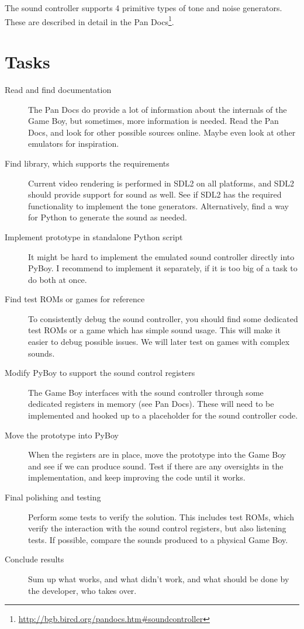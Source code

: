 \documentclass[11pt]{report} %
\begin{document}
The sound controller supports 4 primitive types of tone and noise generators. These are described in detail in the Pan Docs\footnote{\url{http://bgb.bircd.org/pandocs.htm#soundcontroller}}.

\section*{Tasks}
\begin{description}
    \item [Read and find documentation]
        The Pan Docs do provide a lot of information about the internals of the Game Boy, but sometimes, more information is needed. Read the Pan Docs, and look for other possible sources online. Maybe even look at other emulators for inspiration.

    \item [Find library, which supports the requirements]
        Current video rendering is performed in SDL2 on all platforms, and SDL2 should provide support for sound as well. See if SDL2 has the required functionality to implement the tone generators. Alternatively, find a way for Python to generate the sound as needed.

    \item [Implement prototype in standalone Python script]
        It might be hard to implement the emulated sound controller directly into PyBoy. I recommend to implement it separately, if it is too big of a task to do both at once.

    \item [Find test ROMs or games for reference]
        To consistently debug the sound controller, you should find some dedicated test ROMs or a game which has simple sound usage. This will make it easier to debug possible issues. We will later test on games with complex sounds.

    \item [Modify PyBoy to support the sound control registers]
        The Game Boy interfaces with the sound controller through some dedicated registers in memory (see Pan Docs). These will need to be implemented and hooked up to a placeholder for the sound controller code.

    \item [Move the prototype into PyBoy]
        When the registers are in place, move the prototype into the Game Boy and see if we can produce sound. Test if there are any oversights in the implementation, and keep improving the code until it works.

    \item [Final polishing and testing]
        Perform some tests to verify the solution. This includes test ROMs, which verify the interaction with the sound control registers, but also listening tests. If possible, compare the sounds produced to a physical Game Boy.

    \item [Conclude results]
        Sum up what works, and what didn't work, and what should be done by the developer, who takes over.

\end{description}
\end{document}
